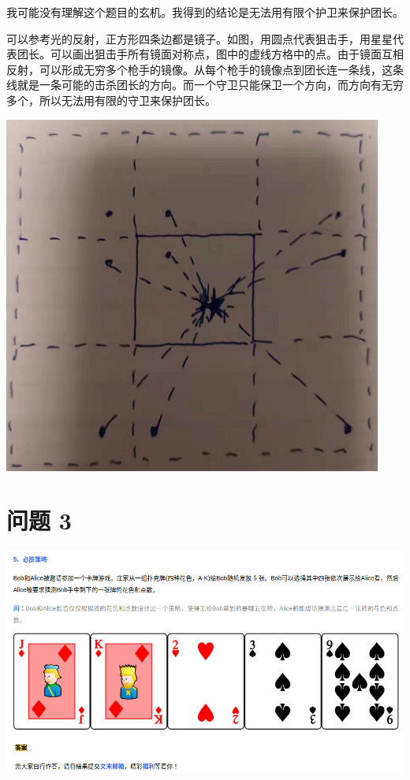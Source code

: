 \documentclass{article}
\begin{document}
我可能没有理解这个题目的玄机。我得到的结论是无法用有限个护卫来保护团长。

可以参考光的反射，正方形四条边都是镜子。如图，用圆点代表狙击手，用星星代表团长。可以画出狙击手所有镜面对称点，图中的虚线方格中的点。由于镜面互相反射，可以形成无穷多个枪手的镜像。从每个枪手的镜像点到团长连一条线，这条线就是一条可能的击杀团长的方向。而一个守卫只能保卫一个方向，而方向有无穷多个，所以无法用有限的守卫来保护团长。

\includegraphics[scale=0.5]{mirror.png}



\newpage
\section{问题 3}
\includegraphics[scale=0.5]{puke.png}
\end{document}
